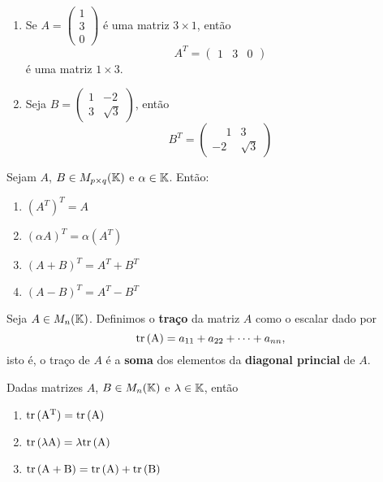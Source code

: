\begin{exemplos}
\begin{enumerate}[label={\arabic*})]
        \item Se $A = \begin{pmatrix}1 \\ 3\\ 0\end{pmatrix}$ é uma matriz $3 \times 1$, então
            \[
                A^T = \begin{pmatrix}1 & 3 & 0\end{pmatrix}
            \]
            é uma matriz $1 \times 3$.

        \item Seja $B = \begin{pmatrix}1 & -2\\3 & \sqrt{3}\end{pmatrix}$, então
            \[
                B^T = \begin{pmatrix}
                    \phantom{-}1 & 3\\
                    -2 & \sqrt{3}
                \end{pmatrix}
            \]
    \end{enumerate}
\end{exemplos}


\begin{proposicao}
    Sejam $A$, $B \in M_{p\times q}(\mathbb{K})$ e $\alpha \in \mathbb{K}$. Então:
    \begin{enumerate}[label={\roman*})]
        \item $(A^T)^T = A$

        \item $(\alpha A)^T = \alpha(A^T)$

        \item $(A + B)^T = A^T + B^T$

        \item $(A - B)^T = A^T - B^T$
    \end{enumerate}
\end{proposicao}

\begin{definicao}
    Seja $A \in M_n(\mathbb{K})$. Definimos o \textbf{traço} da matriz $A$ como o escalar dado por
    \[
        {\rm tr\,(A)} = a_{11} + a_{22} + \cdots + a_{nn},
    \]
    isto é, o traço de $A$ é a \textbf{soma} dos elementos da \textbf{diagonal princial} de $A$.
\end{definicao}

\begin{proposicao}
    Dadas matrizes $A$, $B \in M_n(\mathbb{K})$ e $\lambda \in \mathbb{K}$, então
    \begin{enumerate}[label={\roman*})]
        \item ${\rm tr\,(A^T)} = {\rm tr\,(A)}$

        \item ${\rm tr\,(\lambda A)} = \lambda{\rm tr\,(A)}$

        \item ${\rm tr\,(A + B)} = {\rm tr\,(A)} + {\rm tr\,(B)}$
    \end{enumerate}
\end{proposicao}

